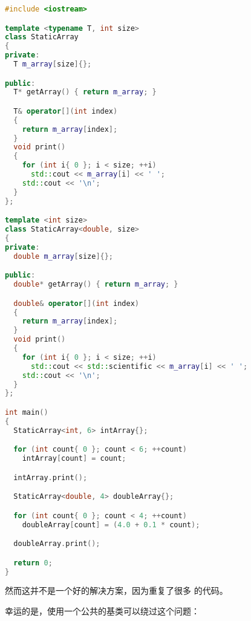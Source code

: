 \documentclass[../../LearnCpp.tex]{subfiles}
\begin{document}
\begin{lstlisting}[language=C++]
#include <iostream>

template <typename T, int size>
class StaticArray
{
private:
  T m_array[size]{};

public:
  T* getArray() { return m_array; }

  T& operator[](int index)
  {
    return m_array[index];
  }
  void print()
  {
    for (int i{ 0 }; i < size; ++i)
      std::cout << m_array[i] << ' ';
    std::cout << '\n';
  }
};

template <int size>
class StaticArray<double, size>
{
private:
  double m_array[size]{};

public:
  double* getArray() { return m_array; }

  double& operator[](int index)
  {
    return m_array[index];
  }
  void print()
  {
    for (int i{ 0 }; i < size; ++i)
      std::cout << std::scientific << m_array[i] << ' ';
    std::cout << '\n';
  }
};

int main()
{
  StaticArray<int, 6> intArray{};

  for (int count{ 0 }; count < 6; ++count)
    intArray[count] = count;

  intArray.print();

  StaticArray<double, 4> doubleArray{};

  for (int count{ 0 }; count < 4; ++count)
    doubleArray[count] = (4.0 + 0.1 * count);

  doubleArray.print();

  return 0;
}
\end{lstlisting}

然而这并不是一个好的解决方案，因为重复了很多  的代码。

幸运的是，使用一个公共的基类可以绕过这个问题：
\end{document}
